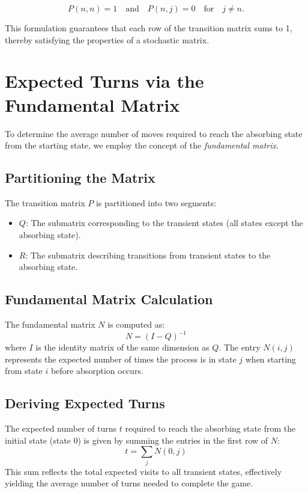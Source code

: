 \documentclass[12pt]{report}
\begin{document}
\[
P(n, n) = 1 \quad \text{and} \quad P(n, j) = 0 \quad \text{for} \quad j \neq n.
\]

	This formulation guarantees that each row of the transition matrix sums to 1, thereby satisfying the properties of a stochastic matrix.
	
	\section{Expected Turns via the Fundamental Matrix}
	
	To determine the average number of moves required to reach the absorbing state from the starting state, we employ the concept of the \textit{fundamental matrix}.
	
	\subsection{Partitioning the Matrix}
	
	The transition matrix $P$ is partitioned into two segments:
	\begin{itemize}
		\item $Q$: The submatrix corresponding to the transient states (all states except the absorbing state).
		\item $R$: The submatrix describing transitions from transient states to the absorbing state.
	\end{itemize}
	
	\subsection{Fundamental Matrix Calculation}
	
	The fundamental matrix $N$ is computed as:
	\[
	N = (I - Q)^{-1}
	\]
	where $I$ is the identity matrix of the same dimension as $Q$. The entry $N(i, j)$ represents the expected number of times the process is in state $j$ when starting from state $i$ before absorption occurs.
	
	\subsection{Deriving Expected Turns}
	
	The expected number of turns $t$ required to reach the absorbing state from the initial state (state 0) is given by summing the entries in the first row of $N$:
	\[
	t = \sum_{j} N(0, j)
	\]
	This sum reflects the total expected visits to all transient states, effectively yielding the average number of turns needed to complete the game.
	
\end{document}
